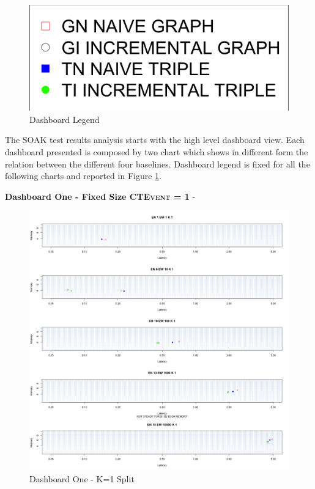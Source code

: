 \begin{figure}[tbh]
	\centering
	\includegraphics[width=0.25\linewidth]{images/dashboard-legend}	
	\caption{Dashboard Legend} 
	\label{fig:dashboard-legend}
\end{figure}

The SOAK test results analysis starts with the high level dashboard view. Each dashboard presented is composed by two chart which shows in different form the relation between the different four baselines. Dashboard legend is fixed for all the following charts and reported in Figure \ref{fig:dashboard-legend}.

\textbf{Dashboard One - Fixed Size \textsc{CTEvent} = 1} - 

\begin{figure}[htb]
	\centering
	\includegraphics[width=0.90\linewidth]{images/dashboard-1-split}	
	\caption{Dashboard One - K=1 Split} 
	\label{fig:result_dashboard_ka}
\end{figure}

